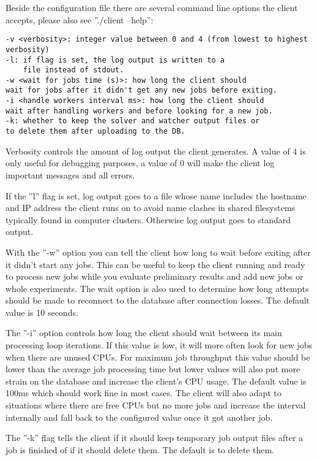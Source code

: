 \documentclass{article}
\begin{document}
Beside the configuration file there are several command line options the client accepts, please also see ''./client --help'':
\begin{verbatim}
-v <verbosity>: integer value between 0 and 4 (from lowest to highest verbosity)
-l: if flag is set, the log output is written to a
	file instead of stdout.
-w <wait for jobs time (s)>: how long the client should
wait for jobs after it didn't get any new jobs before exiting.
-i <handle workers interval ms>: how long the client should
wait after handling workers and before looking for a new job.
-k: whether to keep the solver and watcher output files or
to delete them after uploading to the DB.
\end{verbatim}

Verbosity controls the amount of log output the client generates. A value of 4 is only useful for debugging purposes, a value of 0 will make the client log important messages and all errors.

If the ''l'' flag is set, log output goes to a file whose name includes the hostname and IP address the client runs on to avoid name clashes in shared filesystems typically found in computer clusters.
Otherwise log output goes to standard output.

With the ''-w'' option you can tell the client how long to wait before exiting after it didn't start any jobs. This can be useful to keep the client running and ready to process new jobs
while you evaluate preliminary results and add new jobs or whole experiments. The wait option is also used to determine how long attempts should be made to reconnect to the database after
connection losses. The default value is 10 seconds.

The ''-i'' option controls how long the client should wait between its main processing loop iterations. If this value is low, it will more often look for new jobs when there are unused CPUs.
For maximum job throughput this value should be lower than the average job processing time but lower values will also put more strain on the database and increase the client's CPU usage. The default
value is 100ms which should work fine in most cases. The client will also adapt to situations where there are free CPUs but no more jobs and increase the interval internally and fall back to the configured
value once it got another job.

The ''-k'' flag tells the client if it should keep temporary job output files after a job is finished of if it should delete them. The default is to delete them.
\end{document}
